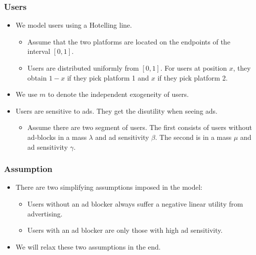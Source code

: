 \documentclass{beamer}
\newcommand{\hl}[1]{\textcolor{myblue}{#1}}
\begin{document}
\begin{frame}
    \frametitle{Users}
    \begin{itemize}
        \item We model users using a \hl{Hotelling line}.
            \begin{itemize}
                \item Assume that the two platforms are located on the endpoints
                    of the interval $[0,1]$.
                \item Users are distributed uniformly from $[0,1]$. 
                    For users at position $x$, they obtain $1-x$ 
                    if they pick platform 1 and $x$ if they pick platform 2.
            \end{itemize}
        \item We use $m$ to denote the independent exogeneity of users.
        \item Users are \hl{sensitive to ads}. They get the disutility when seeing ads.
            \begin{itemize}
                \item Assume there are \hl{two segment of users}. The first
                    consists of users without ad-blocks in a mass $\lambda$
                    and ad sensitivity $\beta$.
                    The second is in a mass $\mu$ and ad sensitivity $\gamma$.
            \end{itemize}
    \end{itemize}
\end{frame}

\begin{frame}
    \frametitle{Assumption}
    \begin{itemize}
        \item There are two simplifying assumptions imposed in the model:
            \begin{itemize}
                \item Users without an ad blocker always 
                    suffer a negative linear utility from advertising.
                \item Users with an ad blocker are only 
                    those with high ad sensitivity.
            \end{itemize}
        \item We will relax these two assumptions in the end.
    \end{itemize}
\end{frame}
\end{document}
